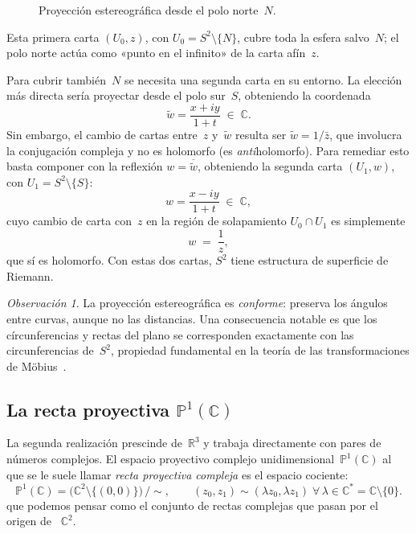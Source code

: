 \documentclass[11pt,a4paper]{article}
\theoremstyle{plain}
\theoremstyle{definition}
\theoremstyle{remark}
\newtheorem{observacion}[teorema]{Observación}
\newcommand{\C}{\mathbb{C}}
\newcommand{\R}{\mathbb{R}}
\newcommand{\Puno}{\mathbb{P}^1(\mathbb{C})}
\begin{document}
\begin{figure}[ht]
\caption{Proyección estereográfica desde el polo norte~$N$.
 }
\label{fig:stereo}
\end{figure}

Esta primera carta $(U_0, z)$, con $U_0 = S^2\setminus\{N\}$, cubre toda
la esfera salvo~$N$; el polo norte actúa como «punto en el infinito» de
la carta afín~$z$.

Para cubrir también~$N$ se necesita una segunda carta en su entorno.
La elección más directa sería proyectar desde el polo sur~$S$,
obteniendo la coordenada
\[
  \tilde{w} = \frac{x+iy}{1+t}\;\in\;\C.
\]
Sin embargo, el cambio de cartas entre~$z$ y~$\tilde{w}$ resulta ser
$\tilde{w} = 1/\bar{z}$, que involucra la conjugación compleja y
no es holomorfo (es \emph{anti}holomorfo).
Para remediar esto basta componer con la reflexión $w=\overline{\tilde{w}}$,
obteniendo la segunda carta $(U_1, w)$, con $U_1 = S^2\setminus\{S\}$:
\[
  w = \frac{x-iy}{1+t}\;\in\;\C,
\]
cuyo cambio de carta con~$z$ en la región de solapamiento $U_0\cap U_1$ es
simplemente
\[
  w \;=\; \frac{1}{z},
\]
que sí es holomorfo.
Con estas dos cartas, $S^2$ tiene estructura de superficie de Riemann.

\begin{observacion}
La proyección estereográfica es \emph{conforme}: preserva los ángulos
entre curvas, aunque no las distancias.
Una consecuencia notable es que los círcunferencias y rectas del plano se
corresponden exactamente con las circunferencias de~$S^2$, propiedad fundamental
en la teoría de las transformaciones de Möbius~\cite{Needham1997}.
\end{observacion}

\subsection{La recta proyectiva \texorpdfstring{$\Puno$}{P1(C)}}

La segunda realización prescinde de~$\R^3$ y trabaja directamente con
pares de números complejos.
El espacio proyectivo complejo unidimensional~$\Puno$ al que se le suele llamar  \emph{recta proyectiva compleja} es el 
espacio cociente:
\[
  \Puno = \bigl(\C^2\setminus\{(0,0)\}\bigr)\,\big/\!\sim,
  \qquad
  (z_0,z_1)\sim(\lambda z_0,\lambda z_1)\;\forall\,\lambda\in\C^*= \C \setminus \{0\}.
\]
que podemos pensar como el conjunto de rectas complejas que pasan por el origen de ~$\C^2$.
\end{document}
